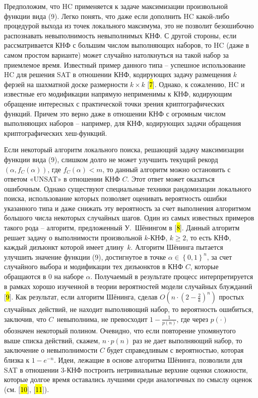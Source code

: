 Предположим, что HC применяется к задаче максимизации произвольной функции вида (9). Легко понять, что даже если дополнить HC какой-либо процедурой выхода из точек локального максимума, это не позволит безошибочно распознавать невыполнимость невыполнимых КНФ. С другой стороны, если рассматривается КНФ с большим числом выполняющих наборов, то HC (даже в самом простом варианте) может случайно натолкнуться на такой набор за приемлемое время. Известный пример данного типа \--- успешное использование HC для решения SAT в отношении КНФ, кодирующих задачу размещения $k$ ферзей на шахматной доске размерности $k \times k$ {[}\hl{7}{]}. Однако, к сожалению, HC и известные его модификации напрямую неприменимы к КНФ, кодирующим обращение интересных с практической точки зрения криптографических функций. Причем это верно даже в отношении КНФ с огромным числом выполняющих наборов \--- например, для КНФ, кодирующих задачи обращения криптографических хеш-функций.

Если некоторый алгоритм локального поиска, решающий задачу максимизации функции вида (9), слишком долго не может улучшить текущий рекорд $\left( \alpha,f_{C}(\alpha) \right)$, где $f_{C}(\alpha) < m$, то данный алгоритм можно остановить с ответом «UNSAT» в отношении КНФ $C$. Этот ответ может оказаться ошибочным. Однако существуют специальные техники рандомизации локального поиска, использование которых позволяет оценивать вероятность ошибки указанного типа и даже снижать эту вероятность за счет выполнения алгоритмом большого числа некоторых случайных шагов. Один из самых известных примеров такого рода \--- алгоритм, предложенный У.~Шёнингом в {[}\hl{8}{]}. Данный алгоритм решает задачу о выполнимости произвольной $k$-КНФ, $k \geq 2$, то есть КНФ, каждый дизъюнкт которой имеет длину~$k$. Алгоритм Шёнинга пытается улучшить значение функции (9), достигнутое в точке $\alpha \in \left\{ 0,1 \right\}^{n}$, за счет случайного выбора и модификации тех дизъюнктов в КНФ $C$, которые обращаются в 0 на наборе $\alpha$. Получаемый в результате процесс интерпретируется в рамках хорошо изученной в теории вероятностей модели случайных блужданий {[}\hl{9}{]}. Как результат, если алгоритм Шёнинга, сделав $O\left( n \cdot \left( 2 - \frac{2}{k} \right)^{n} \right)$ простых случайных действий, не находит выполняющий набор, то вероятность ошибиться, заключив, что $C$~невыполнима, не превосходит $1 - \frac{1}{p(n)}$, где через $p( \cdot )$ обозначен некоторый полином. Очевидно, что если повторение упомянутого выше списка действий, скажем, $n \cdot p(n)$ раз не дает выполняющий набор, то заключение о невыполнимости $C$ будет справедливым с вероятностью, которая близка к $1 - e^{- n}$. Идеи, лежащие в основе алгоритма Шёнинга, позволили для SAT в отношении 3-КНФ построить нетривиальные верхние оценки сложности, которые долгое время оставались лучшими среди аналогичных по смыслу оценок (см. {[}\hl{10}{]}, {[}\hl{11}{]}).

